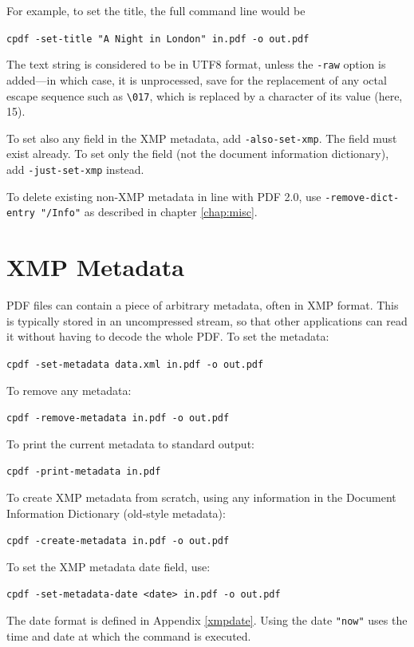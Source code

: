 \documentclass{book}
\begin{document}
  \vspace{2mm}
  For example, to set the title, the full command line would be
  \begin{framed}
    \noindent\small\verb!cpdf -set-title "A Night in London" in.pdf -o out.pdf!
  \end{framed}
\noindent The text string is considered to be in UTF8 format, unless the \texttt{-raw}
option is added---in which case, it is unprocessed, save for the replacement of any octal escape sequence such as \texttt{\textbackslash 017}, which is replaced by a character of its value (here, 15).

To set also any field in the XMP metadata, add \texttt{-also-set-xmp}. The field must exist already. To set only the field (not the document information dictionary), add \texttt{-just-set-xmp} instead.

To delete existing non-XMP metadata in line with PDF 2.0, use \texttt{-remove-dict-entry "/Info"} as described in chapter \ref{chap:misc}.

  \section{XMP Metadata}
  PDF files can contain a piece of arbitrary metadata, often in XMP format.
This is typically stored in an uncompressed stream, so that other applications
can read it without having to decode the whole PDF. To set the metadata:
  \begin{framed}
    \noindent\small\verb!cpdf -set-metadata data.xml in.pdf -o out.pdf!
  \end{framed}
  \noindent To remove any metadata:
  \begin{framed}
    \noindent\small\verb!cpdf -remove-metadata in.pdf -o out.pdf!
  \end{framed}
  \noindent To print the current metadata to standard output:
  \begin{framed}
    \noindent\small\verb!cpdf -print-metadata in.pdf!
  \end{framed}
  \noindent To create XMP metadata from scratch, using any information in the Document Information Dictionary (old-style metadata):
  \begin{framed}
    \noindent\small\verb!cpdf -create-metadata in.pdf -o out.pdf!
  \end{framed}
  \noindent To set the XMP metadata date field, use:
  \begin{framed}
    \noindent\small\verb!cpdf -set-metadata-date <date> in.pdf -o out.pdf!
  \end{framed}
\noindent The date format is defined in Appendix \ref{xmpdate}. Using the date \texttt{"now"} uses the time and date
at which the command is executed.
\end{document}
